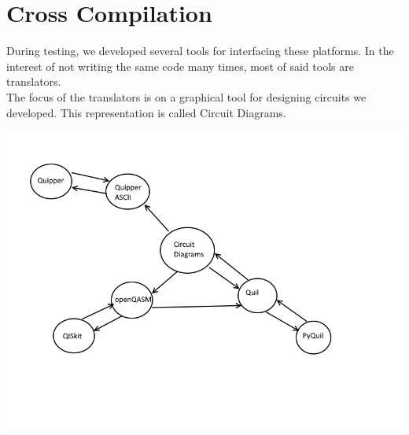 \documentclass[a4paper,10pt]{article}
\begin{document}
\section{Cross Compilation}

During testing, we developed several tools for interfacing these platforms. In the interest of not writing the same code many times, most of said tools are translators. \\
The focus of the translators is on a graphical tool for designing circuits we developed. This representation is called Circuit Diagrams.

\begin{center}
\includegraphics[width=15cm]{translation}
\end{center}


\printbibliography
\end{document}
